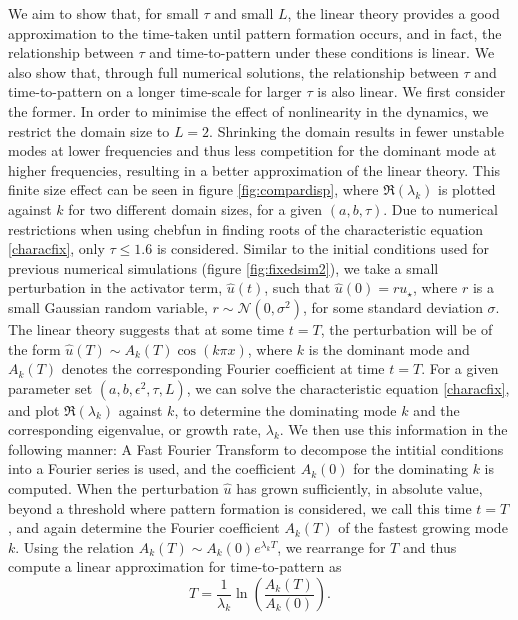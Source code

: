 We aim to show that, for small $\tau$ and small $L$, the linear theory provides a good approximation to the time-taken until pattern formation occurs, and in fact, the relationship between $\tau$ and time-to-pattern under these conditions is linear. We also show that, through full numerical solutions, the relationship between $\tau$ and time-to-pattern on a longer time-scale for larger $\tau$ is also linear. We first consider the former. In order to minimise the effect of nonlinearity in the dynamics, we restrict the domain size to $L=2$. Shrinking the domain results in fewer unstable modes at lower frequencies and thus less competition for the dominant mode at higher frequencies, resulting in a better approximation of the linear theory. This finite size effect can be seen in figure \ref{fig:compardisp}, where $\Re(\lambda_k)$ is plotted against $k$ for two different domain sizes, for a given $(a,b,\tau)$. Due to numerical restrictions when using chebfun in finding roots of the characteristic equation \eqref{characfix}, only $\tau\leq1.6$ is considered. Similar to the initial conditions used for previous numerical simulations (figure \ref{fig:fixedsim2}), we take a small perturbation in the activator term, $\hat{u}(t)$, such that $\hat{u}(0)=ru_\star$, where $r$ is a small Gaussian random variable, $r\sim\mathcal{N}(0,\sigma^2)$,
for some standard deviation $\sigma$. The linear theory suggests that at some time $t=T$, the perturbation will be of the form $\hat{u}(T)\sim A_k(T)\cos(k\pi x)$, where $k$ is the dominant mode and $A_k(T)$ denotes the corresponding Fourier coefficient at time $t=T$. For a given parameter set $(a,b,\epsilon^2,\tau,L)$, we can solve the characteristic equation \eqref{characfix}, and plot $\Re(\lambda_k)$
against $k$, to determine the dominating mode $k$ and the corresponding eigenvalue, or growth rate, $\lambda_k$. We then use this information in the following manner: A Fast Fourier Transform to decompose the intitial conditions into a Fourier series is used, and the coefficient $A_k(0)$ for the dominating $k$ is computed. When the perturbation $\hat{u}$ has grown sufficiently, in absolute value, beyond a threshold where pattern formation is considered, we call this time $t=T$, and again determine the Fourier coefficient $A_k(T)$ of the fastest growing mode $k$. Using the relation $A_k(T)\sim A_k(0)e^{\lambda_k T}$, we rearrange for $T$ and thus compute a linear approximation for time-to-pattern as
\begin{equation}
    T=\frac{1}{\lambda_k}\ln\left(\frac{A_k(T)}{A_k(0)}\right).
\end{equation}
